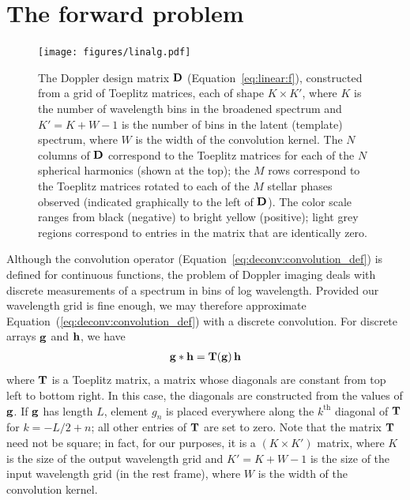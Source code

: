 \documentclass[modern]{aastex631}
\begin{document}
\section{The forward problem}
\label{sec:linear}

\begin{figure}[ht!]
    \begin{centering}
        \texttt{[image: figures/linalg.pdf]}
        \caption{%
            The Doppler design matrix ${\mathbf{D}}$ (Equation~\ref{eq:linear:f}), constructed from a grid of Toeplitz matrices, each of shape $K \times K'$, where $K$ is the number of wavelength bins in the broadened spectrum and $K' = K + W - 1$ is the number of bins in the latent (template) spectrum, where $W$ is the width of the convolution kernel.
            The $N$ columns of ${\mathbf{D}}$ correspond to the Toeplitz matrices for each of the $N$ spherical harmonics (shown at the top);
            the $M$ rows correspond to the Toeplitz matrices rotated to each of the $M$ stellar phases observed (indicated graphically to the left of ${\mathbf{D}}$).
            The color scale ranges from black (negative) to bright yellow (positive); light grey regions correspond to entries in the matrix that are identically zero.
        }
        \label{fig:linalg}
    \end{centering}
\end{figure}

Although the convolution operator (Equation~\ref{eq:deconv:convolution_def}) is defined for continuous functions, the problem of Doppler imaging deals with discrete measurements of a spectrum in bins of log wavelength. 
Provided our wavelength grid is fine enough, we may therefore approximate Equation~(\ref{eq:deconv:convolution_def}) with a discrete convolution.
For discrete arrays ${\mathbf{g}}$ and ${\mathbf{h}}$, we have
%
\begin{align}
    \label{eq:linear:convolution_def}
    {\ensuremath{\mathbf{g}}} * {\mathbf{h}} = {\mathbf{T(g)}} \, {\mathbf{h}}
\end{align}
%
where ${\mathbf{T}}$ is a Toeplitz matrix, a matrix whose diagonals are constant from top left to bottom right. 
In this case, the diagonals are constructed from the values of ${\mathbf{g}}$. 
If ${\mathbf{g}}$ has length $L$, element $g_n$ is placed everywhere along the $k^\mathrm{th}$ diagonal of ${\mathbf{T}}$ for $k = -L / 2 + n$; all other entries of ${\mathbf{T}}$ are set to zero. 
Note that the matrix ${\mathbf{T}}$ need not be square; in fact, for our purposes, it is a $(K \times K')$ matrix, where $K$ is the size of the output wavelength grid and $K' = K + W - 1$ is the size of the input wavelength grid (in the rest frame), where $W$ is the width of the convolution kernel.
\end{document}
